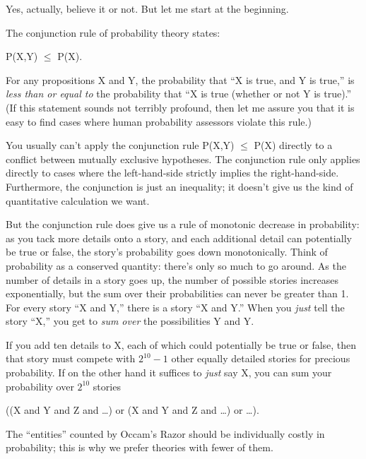 {
 Yes, actually, believe it or not. But let me start at the
beginning.}

{
 The conjunction rule of probability theory states:}

{\centering
 P(X,Y) ${\leq}$ P(X).
\par}


\bigskip

{
 For any propositions X and Y, the probability that
``X is true, and Y is true,'' is
\textit{less than or equal to} the probability that
``X is true (whether or not Y is
true).'' (If this statement sounds not terribly
profound, then let me assure you that it is easy to find cases where
human probability assessors violate this rule.) }

{
 You usually can't apply the conjunction rule
P(X,Y) ${\leq}$ P(X) directly to a conflict between mutually exclusive
hypotheses. The conjunction rule only applies directly to cases where
the left-hand-side strictly implies the right-hand-side. Furthermore,
the conjunction is just an inequality; it doesn't give
us the kind of quantitative calculation we want.}

{
 But the conjunction rule does give us a rule of monotonic decrease
in probability: as you tack more details onto a story, and each
additional detail can potentially be true or false, the
story's probability goes down monotonically. Think of
probability as a conserved quantity: there's only so
much to go around. As the number of details in a story goes up, the
number of possible stories increases exponentially, but the sum over
their probabilities can never be greater than 1. For every story
``X and Y,'' there is a story
``X and {\textlnot}Y.'' When you
\textit{just} tell the story ``X,''
you get to \textit{sum over} the possibilities Y and {\textlnot}Y.}

{
 If you add ten details to X, each of which could potentially be
true or false, then that story must compete with $2^{10}
- 1$ other equally detailed stories for precious probability. If on the
other hand it suffices to \textit{just} say X, you can sum your
probability over $2^{10}$ stories}

{\centering
 ((X and Y and Z and \ldots) or (X and {\textlnot}Y and Z and \ldots)
or \ldots).
\par}


\bigskip

{
 The ``entities'' counted by
Occam's Razor should be individually costly in
probability; this is why we prefer theories with fewer of them. }


